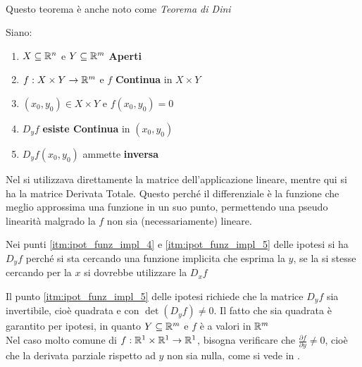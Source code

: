 \begin{theorem}~
	\label{teo:funz_impl}
	\vspace*{-\baselineskip}
	\begin{note}
		Questo teorema è anche noto come \textit{Teorema di Dini}
	\end{note}
	Siano:
	\begin{enumerate}[noitemsep]
		\item \label{itm:ipot_funz_impl_1} $X \subseteq \mathbb{R}^n$ e $Y \subseteq \mathbb{R}^m$ \textbf{Aperti}
		\item \label{itm:ipot_funz_impl_2} $f: X \times Y \to \mathbb{R}^m$ e $f$ \textbf{Continua} in $X \times Y$
		\item \label{itm:ipot_funz_impl_3} $(x_0, y_0) \in X \times Y$ e $f(x_0, y_0) = 0$
		\item \label{itm:ipot_funz_impl_4} $D_yf$ \textbf{esiste Continua} in $(x_0, y_0)$
		\item \label{itm:ipot_funz_impl_5} $D_yf(x_0, y_0)$ ammette \textbf{inversa}
	\end{enumerate}
	\begin{note}
		\hypertarget{note:teo_funz_impl_note_ipot1}{}
		Nel  si utilizzava direttamente la matrice dell'applicazione lineare, mentre qui si ha la matrice Derivata Totale. Questo perché il differenziale è la funzione che meglio approssima una funzione in un suo punto, permettendo una pseudo linearità malgrado la $f$ non sia (necessariamente) lineare.
	\end{note}
	\begin{note}
		Nei punti \ref{itm:ipot_funz_impl_4} e \ref{itm:ipot_funz_impl_5} delle ipotesi si ha $D_yf$ perché si sta cercando una funzione implicita che esprima la $y$, se la si stesse cercando per la $x$ si dovrebbe utilizzare la $D_xf$
	\end{note}
	\begin{note}
		Il punto \ref{itm:ipot_funz_impl_5} delle ipotesi richiede che la matrice $D_yf$ sia invertibile, cioè quadrata e con $\det(D_yf) \neq 0$. Il fatto che sia quadrata è garantito per ipotesi, in quanto $Y \subseteq \mathbb{R}^m$ e $f$ è a valori in $\mathbb{R}^m$\\
		Nel caso molto comune di $f: \mathbb{R}^1 \times \mathbb{R}^1 \to \mathbb{R}^1$, bisogna verificare che $\frac{\partial f}{\partial y} \neq 0$, cioè che la derivata parziale rispetto ad $y$ non sia nulla, come si vede in \fullref{coro:diff_primo_funz_impl_n1_m1}.
	\end{note}

\end{theorem}
